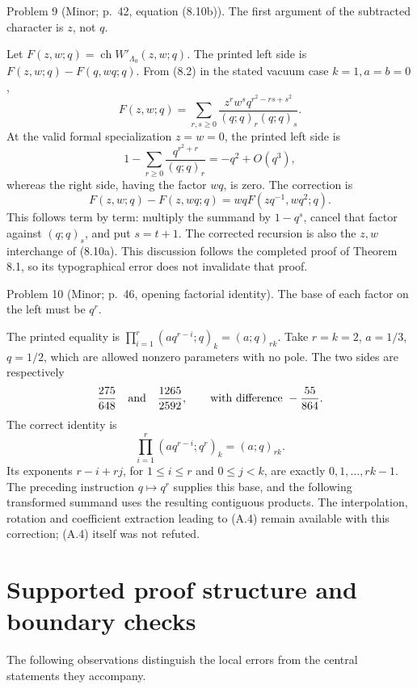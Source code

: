 \documentclass[10pt]{article}
\begin{document}
Problem 9 (Minor; p. 42, equation (8.10b)).  The first argument of the subtracted character is \(z\), not \(q\).\par
Let \(F(z,w;q)=\operatorname{ch}W'_{\Lambda_0}(z,w;q)\). The printed left side is \(F(z,w;q)-F(q,wq;q)\). From (8.2) in the stated vacuum case \(k=1,a=b=0\), \[F(z,w;q)=\sum_{r,s\ge0}
 \frac{z^rw^sq^{r^2-rs+s^2}}{(q;q)_r(q;q)_s}.\] At the valid formal specialization \(z=w=0\), the printed left side is \[1-\sum_{r\ge0}\frac{q^{r^2+r}}{(q;q)_r}
 =-q^2+O(q^3),\] whereas the right side, having the factor \(wq\), is zero. The correction is \[F(z,w;q)-F(z,wq;q)=wqF(zq^{-1},wq^2;q).\] This follows term by term: multiply the summand by \(1-q^s\), cancel that factor against \((q;q)_s\), and put \(s=t+1\). The corrected recursion is also the \(z,w\) interchange of (8.10a). This discussion follows the completed proof of Theorem 8.1, so its typographical error does not invalidate that proof.\par
Problem 10 (Minor; p. 46, opening factorial identity).  The base of each factor on the left must be \(q^r\).\par
The printed equality is \(\prod_{i=1}^r(aq^{r-i};q)_k=(a;q)_{rk}\). Take \(r=k=2\), \(a=1/3\), \(q=1/2\), which are allowed nonzero parameters with no pole. The two sides are respectively \[\frac{275}{648}\quad\hbox{and}\quad\frac{1265}{2592},
 \qquad\hbox{with difference }-\frac{55}{864}.\] The correct identity is \[\prod_{i=1}^r(aq^{r-i};q^r)_k=(a;q)_{rk}.\] Its exponents \(r-i+rj\), for \(1\le i\le r\) and \(0\le j<k\), are exactly \(0,1,\ldots,rk-1\). The preceding instruction \(q\mapsto q^r\) supplies this base, and the following transformed summand uses the resulting contiguous products. The interpolation, rotation and coefficient extraction leading to (A.4) remain available with this correction; (A.4) itself was not refuted.\par
\section*{Supported proof structure and boundary checks}
The following observations distinguish the local errors from the central statements they accompany.\par
\end{document}
